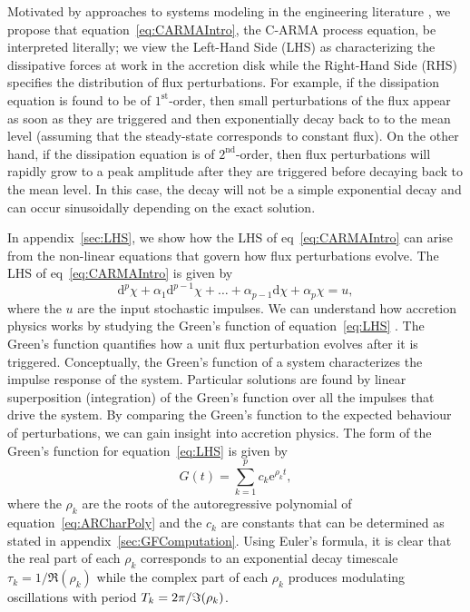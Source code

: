 \documentclass[a4paper,fleqn,usenatbib]{mnras}
\begin{document}
Motivated by approaches to systems modeling in the engineering literature \citep{PanditWu}, we propose that equation~\eqref{eq:CARMAIntro}, the C-ARMA process equation, be interpreted literally; we view the Left-Hand Side (LHS) as characterizing the dissipative forces at work in the accretion disk while the Right-Hand Side (RHS) specifies the distribution of flux perturbations. For example, if the dissipation equation is found to be of $1^{\mathrm{st}}$-order, then small perturbations of the flux appear as soon as they are triggered and then exponentially decay back to to the mean level (assuming that the steady-state corresponds to constant flux). On the other hand, if the dissipation equation is of $2^{\mathrm{nd}}$-order, then flux perturbations will rapidly grow to a peak amplitude after they are triggered before decaying back to the mean level. In this case, the decay will not be a simple exponential decay and can occur sinusoidally depending on the exact solution.

In appendix~\ref{sec:LHS}, we show how the LHS of eq~\eqref{eq:CARMAIntro} can arise from the non-linear equations that govern how flux perturbations evolve. The LHS of eq~\eqref{eq:CARMAIntro} is given by
\begin{equation}\label{eq:LHS}
\mathrm{d}^{p}\chi + \alpha_{1} \mathrm{d}^{p-1}\chi + \ldots + \alpha_{p-1} \mathrm{d}\chi + \alpha_{p} \chi = u,
\end{equation}
where the $u$ are the input stochastic impulses. We can understand how accretion physics works by studying the Green's function of equation~\eqref{eq:LHS} \citep{PanditWu}. The Green's function quantifies how a unit flux perturbation evolves after it is triggered. Conceptually, the Green's function of a system characterizes the impulse response of the system. Particular solutions are found by linear superposition (integration) of the Green's function over all the impulses that drive the system. By comparing the Green's function to the expected behaviour of perturbations, we can gain insight into accretion physics. The form of the Green's function for equation~\eqref{eq:LHS} is given by
\begin{equation}\label{eq:GFSol}
G(t) = \sum_{k = 1}^{p} c_{k} \mathrm{e}^{\rho_{k}t},
\end{equation}
where the $\rho_{k}$ are the roots of the autoregressive polynomial of equation~\eqref{eq:ARCharPoly} and the $c_{k}$ are constants that can be determined as stated in appendix~\ref{sec:GFComputation}. Using Euler's formula, it is clear that the real part of each $\rho_{k}$ corresponds to an exponential decay timescale $\tau_{k} = 1/\Re(\rho_{k})$ while the complex part of each $\rho_{k}$ produces modulating oscillations with period $T_{k} = 2\pi/\Im(\rho_{k})$.
\end{document}
